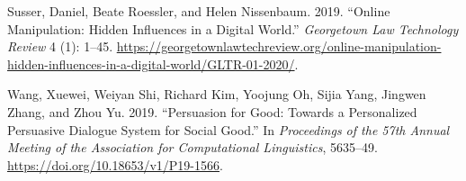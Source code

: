 \documentclass[
  10.5pt,
  letterpaper,
]{article}
\newlength{\cslhangindent}
\newenvironment{CSLReferences}[2] %
 {\begin{list}{}{%
  \setlength{\itemindent}{0pt}
  \setlength{\leftmargin}{0pt}
  \setlength{\parsep}{0pt}
  \ifodd #1
   \setlength{\leftmargin}{\cslhangindent}
   \setlength{\itemindent}{-1\cslhangindent}
  \fi
  \setlength{\itemsep}{#2\baselineskip}}}
 {\end{list}}
\begin{document}
\begin{CSLReferences}{1}{0}
Susser, Daniel, Beate Roessler, and Helen Nissenbaum. 2019. {``Online
Manipulation: Hidden Influences in a Digital World.''} \emph{Georgetown
Law Technology Review} 4 (1): 1--45.
\url{https://georgetownlawtechreview.org/online-manipulation-hidden-influences-in-a-digital-world/GLTR-01-2020/}.

Wang, Xuewei, Weiyan Shi, Richard Kim, Yoojung Oh, Sijia Yang, Jingwen
Zhang, and Zhou Yu. 2019. {``Persuasion for Good: Towards a Personalized
Persuasive Dialogue System for Social Good.''} In \emph{Proceedings of
the 57th Annual Meeting of the Association for Computational
Linguistics}, 5635--49. \url{https://doi.org/10.18653/v1/P19-1566}.

\end{CSLReferences}
\end{document}
